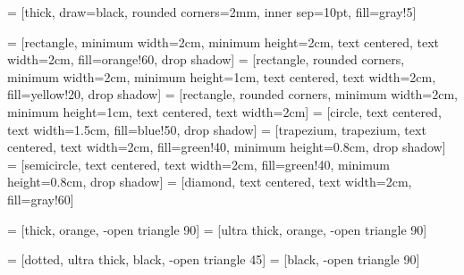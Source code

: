 \usepackage{tikz}
\usetikzlibrary{calc}
\usetikzlibrary{fit}
\usetikzlibrary{shapes}
\usetikzlibrary{positioning}
\usetikzlibrary{matrix, backgrounds, arrows, shadows, decorations, patterns}


 = [thick, draw=black, rounded corners=2mm, inner sep=10pt, fill=gray!5]

 = [rectangle, minimum width=2cm, minimum height=2cm, text centered, text width=2cm, fill=orange!60, drop shadow]
 = [rectangle, rounded corners, minimum width=2cm, minimum height=1cm, text centered, text width=2cm, fill=yellow!20, drop shadow]
 = [rectangle, rounded corners, minimum width=2cm, minimum height=1cm, text centered, text width=2cm]
 = [circle, text centered, text width=1.5cm, fill=blue!50, drop shadow]
 = [trapezium, trapezium, text centered, text width=2cm, fill=green!40, minimum height=0.8cm, drop shadow]
 = [semicircle, text centered, text width=2cm, fill=green!40, minimum height=0.8cm, drop shadow]
 = [diamond, text centered, text width=2cm, fill=gray!60]

 = [thick, orange, -open triangle 90]
 = [ultra thick, orange, -open triangle 90]

 = [dotted, ultra thick, black, -open triangle 45]
 = [black, -open triangle 90]


